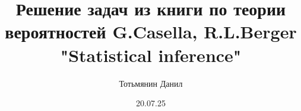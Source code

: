 \documentclass[12pt, a4paper, oneside]{memoir}
\title{Решение задач из книги по теории вероятностей G.Casella, R.L.Berger "Statistical inference"}
\author{Тотьмянин Данил}
\date{20.07.25}
\begin{document}
\begin{titlingpage}
    \maketitle
\end{titlingpage}


\tableofcontents


\end{document}
